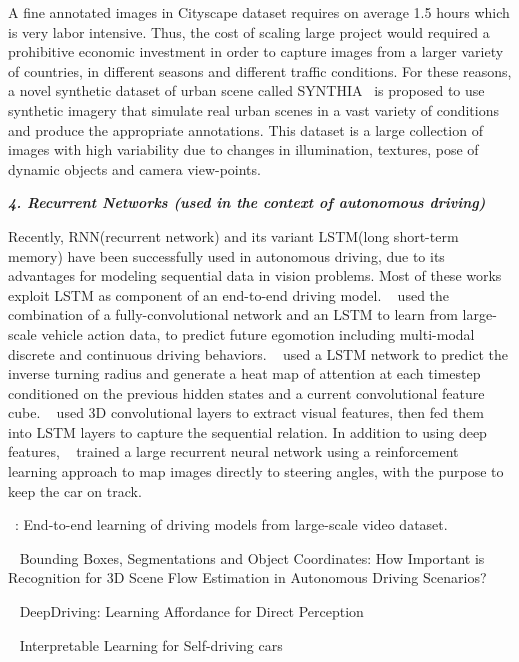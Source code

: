 \documentclass[10pt,twocolumn,letterpaper]{article}
\begin{document}
A fine annotated images in Cityscape dataset requires on average 1.5 hours which is very labor intensive. Thus, the cost of scaling large project would required a prohibitive economic investment in order to capture images from a larger variety of countries, in different seasons and different traffic conditions. For these reasons, a novel synthetic dataset of urban scene called SYNTHIA~\cite{ros2016synthia} is proposed to use synthetic imagery that simulate real urban scenes in a vast variety of conditions and produce the appropriate annotations.
This dataset is a large collection of images with high variability due to changes in illumination, textures, pose of dynamic objects and camera view-points.

\textbf{\emph{4. Recurrent Networks (used in the context of autonomous driving)}}

Recently, RNN(recurrent network) and its variant LSTM(long short-term memory) have been successfully used in autonomous driving, due to its advantages for modeling sequential data in vision problems. Most of these works exploit LSTM as component of an end-to-end driving model. ~\cite{xu2017end} used the combination of a fully-convolutional network and an LSTM to learn from large-scale vehicle action data, to predict future egomotion including multi-modal discrete and continuous driving behaviors. ~\cite{kim2017interpretable} used a LSTM network to predict the inverse turning radius and generate a heat map of attention at each timestep conditioned on the previous hidden states and a current convolutional feature cube. ~\cite{duself} used 3D convolutional layers to extract visual features, then fed them into LSTM layers to capture the sequential relation. In addition to using deep features, ~\cite{koutnik2013evolving} trained a large recurrent neural network using a reinforcement learning approach to map images directly to steering angles, with the purpose to keep the car on track.


~\cite{xu2017end}: End-to-end learning of driving models from large-scale video dataset.

~\cite{behl2017bounding} Bounding Boxes, Segmentations and Object Coordinates: How Important is Recognition for 3D Scene Flow Estimation in Autonomous Driving Scenarios?

~\cite{chen2015deepdriving} DeepDriving: Learning Affordance for Direct Perception

~\cite{kim2017interpretable} Interpretable Learning for Self-driving cars
\end{document}
